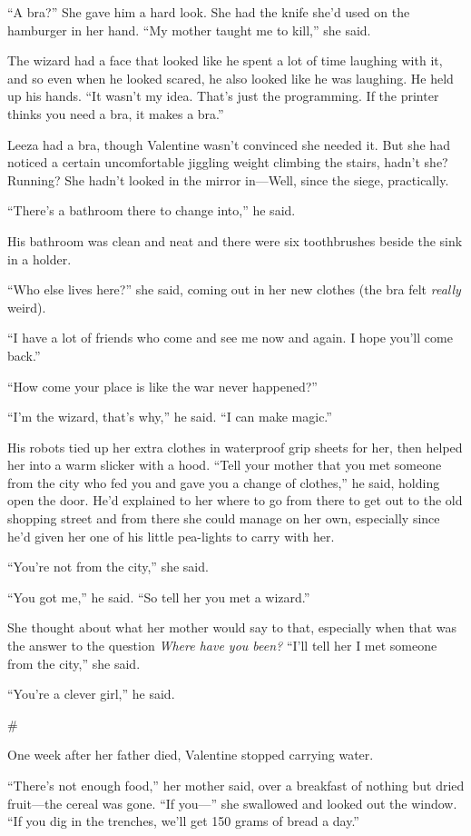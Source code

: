 “A bra?” She gave him a hard look. She had the knife she’d used on
the hamburger in her hand. “My mother taught me to kill,” she
said.

The wizard had a face that looked like he spent a lot of time
laughing with it, and so even when he looked scared, he also looked
like he was laughing. He held up his hands. “It wasn’t my idea.
That’s just the programming. If the printer thinks you need a bra,
it makes a bra.”

Leeza had a bra, though Valentine wasn’t convinced she needed it.
But she had noticed a certain uncomfortable jiggling weight
climbing the stairs, hadn’t she? Running? She hadn’t looked in the
mirror in—Well, since the siege, practically.

“There’s a bathroom there to change into,” he said.

His bathroom was clean and neat and there were six toothbrushes
beside the sink in a holder.

“Who else lives here?” she said, coming out in her new clothes (the
bra felt \emph{really} weird).

“I have a lot of friends who come and see me now and again. I hope
you’ll come back.”

“How come your place is like the war never happened?”

“I’m the wizard, that’s why,” he said. “I can make magic.”

His robots tied up her extra clothes in waterproof grip sheets for
her, then helped her into a warm slicker with a hood. “Tell your
mother that you met someone from the city who fed you and gave you
a change of clothes,” he said, holding open the door. He’d
explained to her where to go from there to get out to the old
shopping street and from there she could manage on her own,
especially since he’d given her one of his little pea-lights to
carry with her.

“You’re not from the city,” she said.

“You got me,” he said. “So tell her you met a wizard.”

She thought about what her mother would say to that, especially
when that was the answer to the question
\emph{Where have you been?} “I’ll tell her I met someone from the
city,” she said.

“You’re a clever girl,” he said.

\#

One week after her father died, Valentine stopped carrying water.

“There’s not enough food,” her mother said, over a breakfast of
nothing but dried fruit—the cereal was gone. “If you—” she
swallowed and looked out the window. “If you dig in the trenches,
we’ll get 150 grams of bread a day.”

